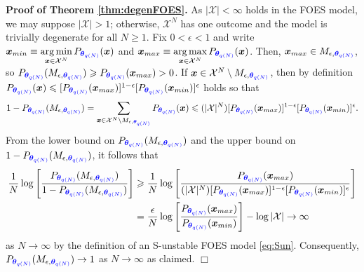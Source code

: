 \documentclass[numbib]{imamat}
\theoremstyle{theorem}
\theoremstyle{lemma}
\theoremstyle{example}
\theoremstyle{corollary}
\theoremstyle{definition}
\theoremstyle{remark}
\theoremstyle{approximation}
\theoremstyle{scheme}
\DeclareMathOperator*{\argmin}{arg\,min}
\DeclareMathOperator*{\argmax}{arg\,max}
\newcommand{\thetaidx}{q(N)}
\newcommand{\thetaN}{\boldsymbol \theta_{\thetaidx}}
\newcommand{\ak}[1]{{\color{blue} #1}}
\begin{document}
\textbf{Proof of Theorem \ref{thm:degenFOES}.} As \(|\mathcal{X}|<\infty\) holds in the FOES model, we may suppose
\(|\mathcal{X}|>1\); otherwise, \(\mathcal{X}^N\) has one outcome and the model is trivially degenerate for all \(N \geq 1\). Fix \(0 < \epsilon < 1\) and write \(\boldsymbol x_{min} \equiv \argmin\limits_{\boldsymbol x \in \mathcal{X}^N}P_{ \ak{\thetaN}}(\boldsymbol x)\) and \(\boldsymbol x_{max} \equiv \argmax\limits_{\boldsymbol x \in \mathcal{X}^N}P_{\ak{\thetaN}}(\boldsymbol x)\). Then, \(\boldsymbol x_{max} \in M_{\epsilon, \ak{\thetaN}}\), so \(P_{\ak{\thetaN}}(M_{\epsilon, \ak{\thetaN}}) \ge P_{ \ak{\thetaN}}(\boldsymbol x_{max}) > 0\). If \(\boldsymbol x \in \mathcal{X}^N \setminus M_{\epsilon, \ak{\thetaN}}\), then by definition
\(P_{\ak{\thetaN}}(\boldsymbol x) \le [P_{\ak{\thetaN}}(\boldsymbol x_{max})]^{1-\epsilon}[P_{\ak{\thetaN}}(\boldsymbol x_{min})]^{\epsilon}\) holds so that
\[
1-P_{\ak{\thetaN}}(M_{\epsilon, \ak{\thetaN}})
 = \sum\limits_{\boldsymbol x \in \mathcal{X}^N \setminus M_{\epsilon, \ak{\thetaN}}}P_{\ak{\thetaN}}(\boldsymbol x)
  \le (|\mathcal{X}|^N)[P_{\ak{\thetaN}}(\boldsymbol x_{max})]^{1-\epsilon}[P_{ \ak{\thetaN}}(\boldsymbol x_{min})]^{\epsilon}.
\]
From the lower bound on \(P_{\ak{\thetaN}}(M_{\epsilon, \ak{\thetaN}})\) and the
upper bound on \(1-P_{\ak{\thetaN}}(M_{\epsilon, \ak{\thetaN}})\), it follows that
\begin{align*}
\frac{1}{N}\log\left[\frac{P_{\ak{\thetaN}}(M_{\epsilon, \ak{\thetaN}})}{1-P_{ \ak{\thetaN}}(M_{\epsilon, \ak{\thetaN}})}\right] & \ge \frac{1}{N} \log\left[\frac{P_{\ak{\thetaN}}(\boldsymbol x_{max})}{(|\mathcal{X}|^N)[P_{ \ak{\thetaN}}(\boldsymbol x_{max})]^{1-\epsilon}[P_{\ak{\thetaN}}(\boldsymbol x_{min})]^{\epsilon}}\right] \\
&= \frac{\epsilon}{N} \log\left[\frac{P_{\ak{\thetaN}}(\boldsymbol x_{max})}{P_{ \ak{\thetaN}}(\boldsymbol x_{min})}\right] - \log |\mathcal{X}| \rightarrow \infty
\end{align*}
as \(N \rightarrow \infty\) by the definition of an S-unstable FOES model \eqref{eq:Sun}. Consequently, \(P_{\ak{\thetaN}}(M_{\epsilon, \ak{\thetaN}}) \rightarrow 1\) as \(N \rightarrow \infty\) as claimed. \hfill \(\Box\)
\end{document}
